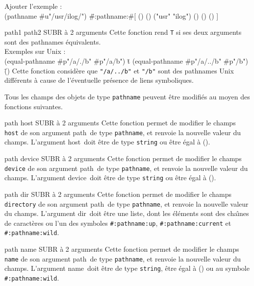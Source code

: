 Ajouter l'exemple :\\
\? {(pathname \#u"/usr/ilog/")}
\= {\#:pathname:\#[ () () ("usr" "ilog") () () () ]}





 {path1 path2} {SUBR \`{a} 2 arguments}
Cette fonction rend {\tt T} si ses deux arguments sont des pathnames \'{e}quivalents.\\
Exemples sur Unix :\\
\? {(equal-pathname \#p"/a/./b" \#p"/a/b")}
\= {t}
\? {(equal-pathname \#p"/a/../b" \#p"/b")}
\= {()}
Cette fonction consid\`{e}re que {\tt "/a/../b"} et {\tt "/b"} sont des pathnames
Unix diff\'{e}rents \`{a} cause de l'\'{e}ventuelle pr\'{e}sence de liens
symboliques.




Tous les champs des objets de type {\tt pathname} peuvent \^{e}tre modifi\'{e}s au moyen
des fonctions suivantes.

 {path host} {SUBR \`{a} 2 arguments}
Cette fonction permet de modifier le champs {\tt host} de son 
argument \LT path\GT\ de
type {\tt pathname}, et renvoie la nouvelle valeur du champs.
L'argument \LT host\GT\ doit \^{e}tre de type {\tt string} ou \^{e}tre \'{e}gal \`{a} ().

 {path device} {SUBR \`{a} 2 arguments}
Cette fonction permet de modifier le champs {\tt device} de son argument \LT path\GT\ de
type {\tt pathname}, et renvoie la nouvelle valeur du champs.
L'argument \LT device\GT\ doit \^{e}tre de type {\tt string} ou \^{e}tre \'{e}gal \`{a} ().

 {path dir} {SUBR \`{a} 2 arguments}
Cette fonction permet de modifier le champs {\tt directory} de son argument \LT path\GT\ de
type {\tt pathname}, et renvoie la nouvelle valeur du champs.
L'argument \LT dir\GT\ doit \^{e}tre une liste, dont les \'{e}l\'{e}ments sont des cha\^{\i}nes
de caract\`{e}res ou l'un des symboles {\tt \#:pathname:up},
{\tt \#:pathname:current} et {\tt \#:pathname:wild}.

 {path name} {SUBR \`{a} 2 arguments}
Cette fonction permet de modifier le champs {\tt name} de son argument \LT path\GT\ de
type {\tt pathname}, et renvoie la nouvelle valeur du champs.
L'argument \LT name\GT\ doit \^{e}tre de type {\tt string}, \^{e}tre \'{e}gal \`{a} () ou au
symbole {\tt \#:pathname:wild}.

